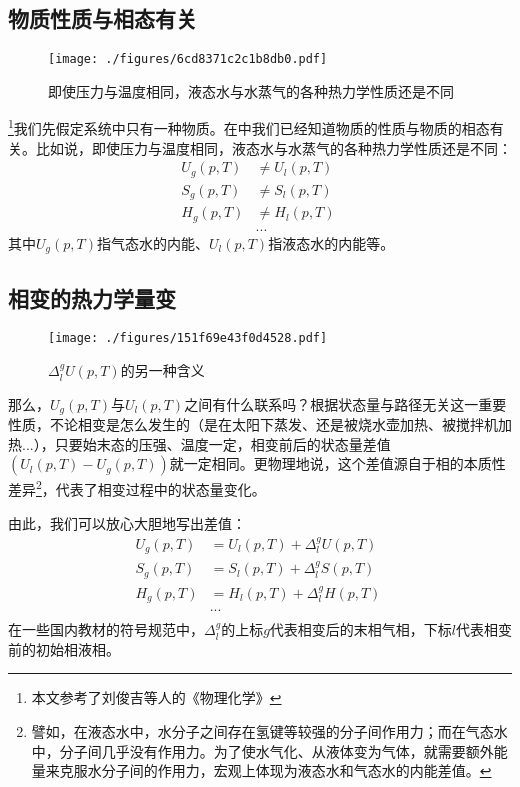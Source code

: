 

\subsection{物质性质与相态有关}
\begin{figure}[ht]
\centering
\texttt{[image: ./figures/6cd8371c2c1b8db0.pdf]}
\caption{即使压力与温度相同，液态水与水蒸气的各种热力学性质还是不同} \label{fig_PTTVC2_1}
\end{figure}

\footnote{本文参考了刘俊吉等人的《物理化学》}我们先假定系统中只有一种物质。在中我们已经知道物质的性质与物质的相态有关。比如说，即使压力与温度相同，液态水与水蒸气的各种热力学性质还是不同：
$$
\begin{aligned}
U_g(p,T) &\ne U_l(p,T)\\
S_g(p,T) &\ne S_l(p,T)\\
H_g(p,T) &\ne H_l(p,T)\\
&...
\end{aligned}~
$$
其中$U_g(p,T)$指气态水的内能、$U_l(p,T)$指液态水的内能等。

\subsection{相变的热力学量变}

\begin{figure}[ht]
\centering
\texttt{[image: ./figures/151f69e43f0d4528.pdf]}
\caption{$\Delta ^ g_l U (p,T)$的另一种含义} \label{fig_PTTVC2_2}
\end{figure}

那么，$U_g(p,T)$与$U_l(p,T)$之间有什么联系吗？根据状态量与路径无关这一重要性质，不论相变是怎么发生的（是在太阳下蒸发、还是被烧水壶加热、被搅拌机加热...），只要始末态的压强、温度一定，相变前后的状态量差值$(U_l(p,T) - U_g(p,T))$就一定相同。更物理地说，这个差值源自于相的本质性差异\footnote{譬如，在液态水中，水分子之间存在氢键等较强的分子间作用力；而在气态水中，分子间几乎没有作用力。为了使水气化、从液体变为气体，就需要额外能量来克服水分子间的作用力，宏观上体现为液态水和气态水的内能差值。}，代表了相变过程中的状态量变化。

由此，我们可以放心大胆地写出差值：
$$
\begin{aligned}
U_g(p,T) &= U_l(p,T) + \Delta ^ g_l U (p,T)\\
S_g(p,T) &= S_l(p,T) + \Delta ^ g_l S (p,T)\\
H_g(p,T) &= H_l(p,T) + \Delta ^ g_l H (p,T)\\
&...\\
\end{aligned}~
$$
在一些国内教材的符号规范中，$\Delta^g_l$的上标$g$代表相变后的末相气相，下标$l$代表相变前的初始相液相。

